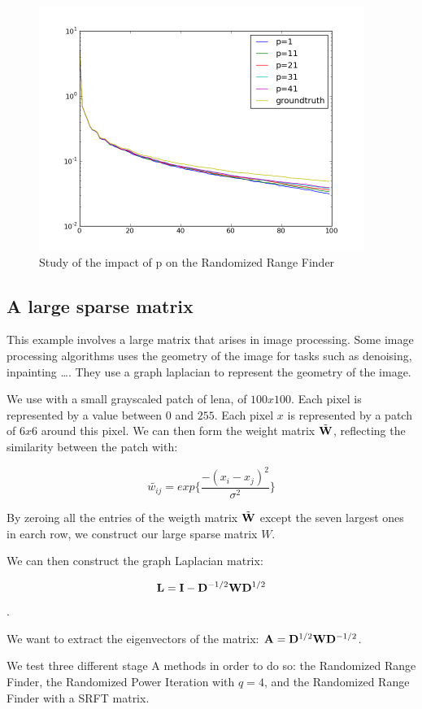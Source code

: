 \documentclass[onecolumn,12pt]{article}
\begin{document}
\begin{figure}[h]
\label{rrf-different-p}
\caption{Study of the impact of p on the Randomized Range Finder}
\includegraphics[width=400px]{./images/l_va.png}
\end{figure}


\subsection{A large sparse matrix}

This example involves a large matrix that arises in image processing. Some
image processing algorithms uses the geometry of the image for tasks such as
denoising, inpainting \dots. They use a graph laplacian to represent the
geometry of the image.

We use with a small grayscaled patch of lena, of $100 x 100$. Each pixel is
represented by a value between $0$ and $255$. Each pixel $x$ is represented by
a patch of $6x6$ around this pixel. We can then form the weight matrix
$\tilde{\bold{W}}$, reflecting the similarity between the patch with:

$$\tilde{w_{ij}} = exp \{ \frac{- (x_i - x_j)^2}{\sigma^2}\}$$

By zeroing all the entries of the weigth matrix $\tilde{\bold{W}}$ except the seven
largest ones in earch row, we construct our large sparse matrix $W$.

We can then construct the graph Laplacian matrix:

$$\bold{L} = \bold{I} - \bold{D}^{-1/2} \bold{W} \bold{D}^{1/2}$$.

We want to extract the eigenvectors of the matrix:
$\bold{A}= \bold{D}^{1/2} \bold{W} \bold{D}^{-1/2}$.

We test three different stage A methods in order to do so: the Randomized
Range Finder, the Randomized Power Iteration with $q=4$, and the Randomized
Range Finder with a SRFT matrix.
\end{document}
